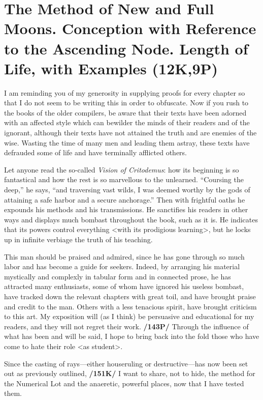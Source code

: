 \section{The Method of New and Full Moons. Conception with Reference to the Ascending Node. Length of Life, with Examples (12K,9P)}

I am reminding you of my generosity in supplying proofs for every chapter so that I do not seem to be writing this in order to obfuscate. Now if you rush to the books of the older compilers, be aware that their texts have been adorned with an affected style which can bewilder the minds of their readers and of the ignorant, although their texts have not attained the truth and are enemies of the wise. Wasting the time of
many men and leading them astray, these texts have defrauded some of life and have terminally afflicted others. 

Let anyone read the so-called  \textit{Vision of Critodemus}: how its beginning is so fantastical and how the rest is so marvellous to the unlearned. “Coursing the deep,” he says, “and traversing vast wilds, I was deemed worthy by the gods of attaining a safe harbor and a secure anchorage.” Then with frightful oaths he expounds his methods and his transmissions. He sanctifies his readers in other ways and displays much
bombast throughout the book, such as it is. He indicates that its powers control everything <with its prodigious learning>, but he locks up in infinite verbiage the truth of his teaching. 

This man should be praised and admired, since he has gone through so much labor and has become a guide for seekers. Indeed, by arranging his material mystically and complexly in tabular form and in connected prose, he has attracted many enthusiasts, some of whom have ignored his useless bombast, have tracked down the relevant chapters with great toil, and have brought praise and credit to the man. Others with a less tenacious spirit, have brought criticism to this art. My exposition will (as I think) be persuasive and educational for my readers, and they will not regret
their work. \textbf{/143P/} Through the influence of what has been and will be said, I hope to bring back into the fold those who have come to hate their role <as student>.

Since the casting of rays—either houseruling or destructive—has now been set out as previously outlined, \textbf{/151K/} I want to share, not to hide, the method for the Numerical Lot and the anaeretic, powerful places, now that I have tested them. 

